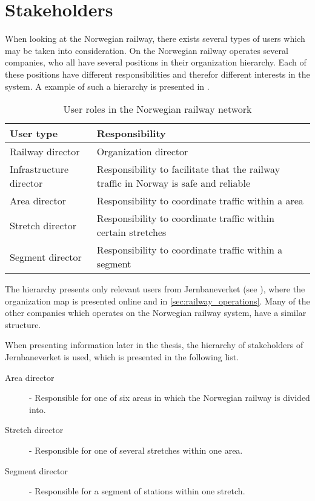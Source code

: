 
\section{Stakeholders} %
\label{sec:back_stakeholders}
When looking at the Norwegian railway, there exists several types of users which
may be taken into consideration. On the Norwegian railway operates several
companies, who all have several positions in their organization hierarchy. Each
of these positions have different responsibilities and therefor different
interests in the system. A example of such a hierarchy is presented in
.

\begin{table}[!h]\small
	\begin{tabularx}{\textwidth}{|l|X|}
		\hline
		User type & Responsibility \\
		\hline
		Railway director & Organization director\\
		\hline
		Infrastructure director & Responsibility to facilitate that the railway traffic in Norway is safe and reliable\\
		\hline
		Area director & Responsibility to coordinate traffic within a area\\
		\hline
		Stretch director & Responsibility to coordinate traffic within certain
		stretches\\
		\hline
		Segment director & Responsibility to coordinate traffic within a segment\\
		\hline
	\end{tabularx}
\caption{User roles in the Norwegian railway network}
\label{table:user_roles}
\end{table}

The hierarchy presents only relevant users from Jernbaneverket (see
), where the organization map is presented
online\cite{jernbaneverketOrganisasjon}\cite{jernbaneverketInfrastruktdivisjon}
and in \ref{sec:railway_operations}.
Many of the other companies which operates on the Norwegian railway system,
have a similar structure. 

When presenting information later in the thesis, the hierarchy of stakeholders of Jernbaneverket is used, which is presented in the following list.
\begin{description}
	\item [Area director] - Responsible for one of six areas in which the 
	Norwegian railway is divided into.
	\item [Stretch director] - Responsible for one of several stretches within 
	one area.
	\item [Segment director] - Responsible for a segment of stations within one stretch.
\end{description}

